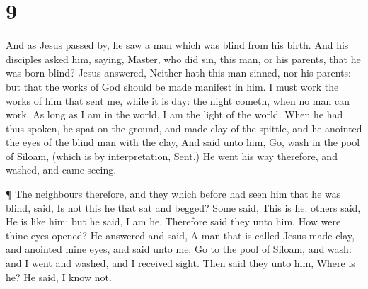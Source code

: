\hypertarget{section-8}{%
\section{9}\label{section-8}}

 And as Jesus passed by, he saw a man which was blind from
his birth.  And his disciples asked him, saying, Master, who
did sin, this man, or his parents, that he was born blind? 
Jesus answered, Neither hath this man sinned, nor his parents: but that
the works of God should be made manifest in him.  I must
work the works of him that sent me, while it is day: the night cometh,
when no man can work.  As long as I am in the world, I am
the light of the world.  When he had thus spoken, he spat on
the ground, and made clay of the spittle, and he anointed the eyes of
the blind man with the clay,  And said unto him, Go, wash in
the pool of Siloam, (which is by interpretation, Sent.) He went his way
therefore, and washed, and came seeing.

 ¶ The neighbours therefore, and they which before had seen
him that he was blind, said, Is not this he that sat and begged?
 Some said, This is he: others said, He is like him: but he
said, I am he.  Therefore said they unto him, How were
thine eyes opened?  He answered and said, A man that is
called Jesus made clay, and anointed mine eyes, and said unto me, Go to
the pool of Siloam, and wash: and I went and washed, and I received
sight.  Then said they unto him, Where is he? He said, I
know not.

